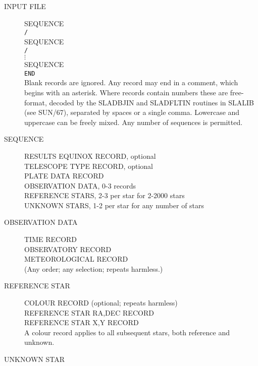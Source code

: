 \documentclass[twoside,11pt]{article}
\newcommand{\xref}[3]{#1}
\newcommand{\xlabel}[1]{}
\renewcommand{\_}{\texttt{\symbol{95}}}
\begin{document}
\begin{description}

\item[\xlabel{INPUT_FILE}INPUT FILE]\mbox{}

 SEQUENCE \\
 \texttt{/} \\
 SEQUENCE \\
 \texttt{/} \\
 $\vdots$ \\
 SEQUENCE \\
 \texttt{END} \\
 Blank records are ignored.
 Any record may end in a comment, which begins with an asterisk.
 Where records contain numbers these are free-format, decoded by the 
 \xref{SLA\_DBJIN}{sun67}{SLA_DBJIN} and \xref{SLA\_DFLTIN}{sun67}{SLA_DFLTIN}
 routines in \xref{SLALIB}{sun67}{} (see SUN/67), separated by spaces or a 
 single comma.  Lowercase and uppercase can be freely mixed.
 Any number of sequences is permitted.

\goodbreak
\item[\xlabel{SEQUENCE}SEQUENCE]\mbox{}

 RESULTS EQUINOX RECORD, optional \\
 TELESCOPE TYPE RECORD, optional \\
 PLATE DATA RECORD \\
 OBSERVATION DATA, 0-3 records \\
 REFERENCE STARS, 2-3 per star for 2-2000 stars \\
 UNKNOWN STARS, 1-2 per star for any number of stars

\goodbreak
\item[\xlabel{OBSERVATION_DATA}OBSERVATION DATA]\mbox{}

 TIME RECORD \\
 OBSERVATORY RECORD \\
 METEOROLOGICAL RECORD \\
 (Any order; any selection; repeats harmless.)

\goodbreak
\item[\xlabel{REFERENCE_STAR}REFERENCE STAR]\mbox{}

 COLOUR RECORD (optional; repeats harmless) \\
 REFERENCE STAR RA,DEC RECORD \\
 REFERENCE STAR X,Y RECORD \\
 A colour record applies to all subsequent stars,
 both reference and unknown.

\goodbreak
\item[\xlabel{UNKNOWN_STAR}UNKNOWN STAR]\mbox{}


\end{description}
\end{document}
